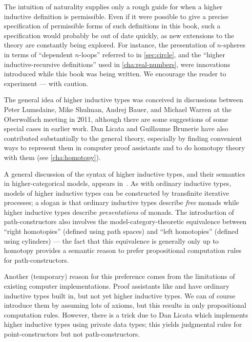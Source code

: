 The intuition of naturality supplies only a rough guide for when a higher inductive definition is permissible.
Even if it were possible to give a precise specification of permissible forms of such definitions in this book, such a specification would probably be out of date quickly, as new extensions to the theory are constantly being explored.
For instance, the presentation of $n$-spheres in terms of ``dependent $n$-loops'' referred to in \autoref{sec:circle}, and the ``higher inductive-recursive definitions'' used in \autoref{cha:real-numbers}, were innovations introduced while this book was being written.
We encourage the reader to experiment --- with caution.


\sectionNotes

The general idea of higher inductive types was conceived in discussions between Peter Lumsdaine, Mike Shulman, Andrej Bauer, and Michael Warren at the Oberwolfach meeting in 2011, although there are some suggestions of some special cases in earlier work.
Dan Licata and Guillaume Brunerie have also contributed substantially to the general theory, especially by finding convenient ways to represent them in computer proof assistants
%
and to do homotopy theory with them (see \autoref{cha:homotopy}).

A general discussion of the syntax of higher inductive types, and their semantics in higher-categorical models, appears in~\cite{ls:hits}.
As with ordinary inductive types, models of higher inductive types can be constructed by transfinite iterative processes; a slogan is that ordinary inductive types describe \emph{free} monads while higher inductive types describe \emph{presentations} of monads.
The introduction of path-constructors also involves the model-category-theoretic equivalence between ``right homotopies'' (defined using path spaces) and ``left homotopies'' (defined using cylinders) --- the fact that this equivalence is generally only up to homotopy provides a semantic reason to prefer propositional computation rules for path-constructors.

Another (temporary) reason for this preference comes from the limitations of existing computer implementations.
Proof assistants like \Coq and \Agda have ordinary inductive types built in, but not yet higher inductive types.
We can of course introduce them by assuming lots of axioms, but this results in only propositional computation rules.
However, there is a trick due to Dan Licata which implements higher inductive types using private data types; this yields judgmental rules for point-constructors but not path-constructors.

